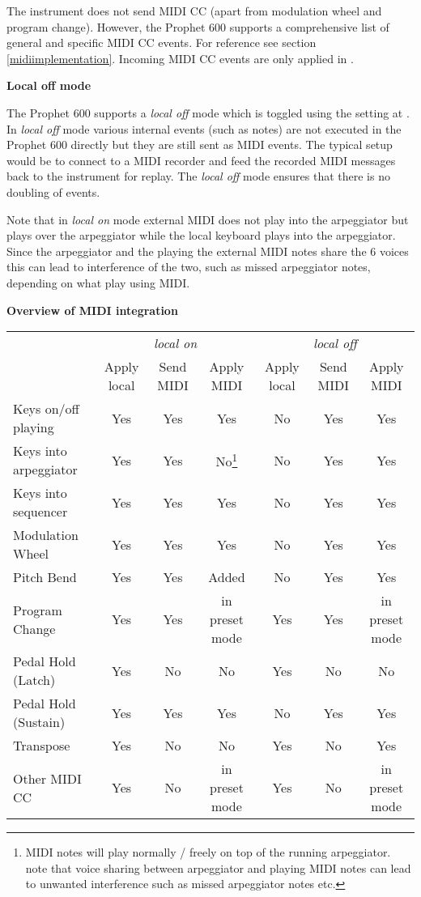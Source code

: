The instrument does not send MIDI CC (apart from modulation wheel and program change). However, the Prophet 600 supports a comprehensive list of general and specific MIDI CC events. For reference see section \ref{midiimplementation}. Incoming MIDI CC events are only applied in \presetmode.

\textbf{Local off mode}

The Prophet 600 supports a \textit{local off} mode which is toggled using the setting at . In \textit{local off} mode various internal events (such as notes) are not executed in the Prophet 600 directly but they are still sent as MIDI events. The typical setup would be to connect to a MIDI recorder and feed the recorded MIDI messages back to the instrument for replay. The \textit{local off} mode ensures that there is no doubling of events.

Note that in \textit{local on} mode external MIDI does not play into the arpeggiator but plays over the arpeggiator while the local keyboard plays into the arpeggiator. Since the arpeggiator and the playing the external MIDI notes share the 6 voices this can lead to interference of the two, such as missed arpeggiator notes, depending on what play using MIDI. 

\textbf{Overview of MIDI integration}

\begin{table}[H]
  \begin{tabular}{lcccccc}
     &
      \multicolumn{3}{c}{\textit{local on}} &
      \multicolumn{3}{c}{\textit{local off}} \\   \cline{2-7} 
    & Apply local & Send MIDI & Apply MIDI & Apply local & Send MIDI & Apply MIDI \\
    \hline
      \vline Keys on/off playing	& Yes & Yes	& Yes & No & Yes & Yes \\
      Keys into arpeggiator	& Yes & Yes	& No\footnote{MIDI notes will play normally / freely on top of the running arpeggiator. note that voice sharing between arpeggiator and playing MIDI notes can lead to unwanted interference such as missed arpeggiator notes etc.} & No & Yes & Yes \\
      Keys into sequencer	& Yes & Yes	& Yes & No & Yes & Yes \\
      Modulation Wheel	& Yes & Yes	& Yes & No & Yes & Yes \\
      Pitch Bend	& Yes & Yes	& Added & No & Yes & Yes \\
      Program Change	& Yes & Yes	& in preset mode & Yes & Yes & in preset mode \\
      Pedal Hold (Latch)	& Yes & No & No & Yes & No & No \\
      Pedal Hold (Sustain)	& Yes & Yes & Yes & No & Yes & Yes \\
      Transpose & Yes & No & No & Yes & No & Yes \\
      Other MIDI CC	& Yes & No & in preset mode & Yes & No & in preset mode \\
  \end{tabular}
\end{table}
